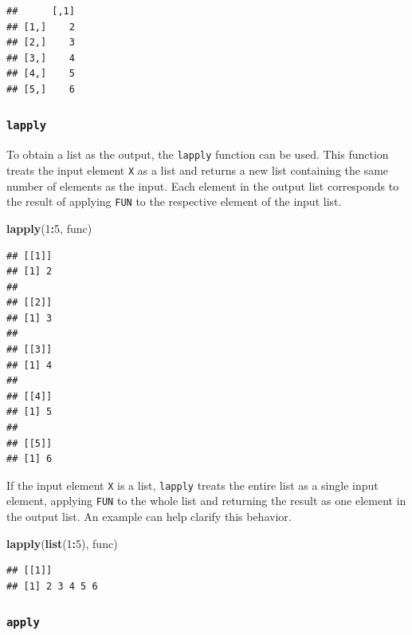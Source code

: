 \documentclass[
]{article}
\newenvironment{Shaded}{\begin{snugshade}}{\end{snugshade}}
\newcommand{\DecValTok}[1]{\textcolor[rgb]{0.00,0.00,0.81}{#1}}
\newcommand{\FunctionTok}[1]{\textcolor[rgb]{0.13,0.29,0.53}{\textbf{#1}}}
\newcommand{\NormalTok}[1]{#1}
\newcommand{\SpecialCharTok}[1]{\textcolor[rgb]{0.81,0.36,0.00}{\textbf{#1}}}
\begin{document}
\begin{verbatim}
##      [,1]
## [1,]    2
## [2,]    3
## [3,]    4
## [4,]    5
## [5,]    6
\end{verbatim}

\subsubsection{\texorpdfstring{\texttt{lapply}}{lapply}}\label{lapply}

To obtain a list as the output, the \texttt{lapply} function can be used. This function treats the input element \texttt{X} as a list and returns a new list containing the same number of elements as the input. Each element in the output list corresponds to the result of applying \texttt{FUN} to the respective element of the input list.

\begin{Shaded}
\begin{Highlighting}[]
\FunctionTok{lapply}\NormalTok{(}\DecValTok{1}\SpecialCharTok{:}\DecValTok{5}\NormalTok{, func)}
\end{Highlighting}
\end{Shaded}

\begin{verbatim}
## [[1]]
## [1] 2
## 
## [[2]]
## [1] 3
## 
## [[3]]
## [1] 4
## 
## [[4]]
## [1] 5
## 
## [[5]]
## [1] 6
\end{verbatim}

If the input element \texttt{X} is a list, \texttt{lapply} treats the entire list as a single input element, applying \texttt{FUN} to the whole list and returning the result as one element in the output list. An example can help clarify this behavior.

\begin{Shaded}
\begin{Highlighting}[]
\FunctionTok{lapply}\NormalTok{(}\FunctionTok{list}\NormalTok{(}\DecValTok{1}\SpecialCharTok{:}\DecValTok{5}\NormalTok{), func)}
\end{Highlighting}
\end{Shaded}

\begin{verbatim}
## [[1]]
## [1] 2 3 4 5 6
\end{verbatim}

\subsubsection{\texorpdfstring{\texttt{apply}}{apply}}\label{apply}
\end{document}
